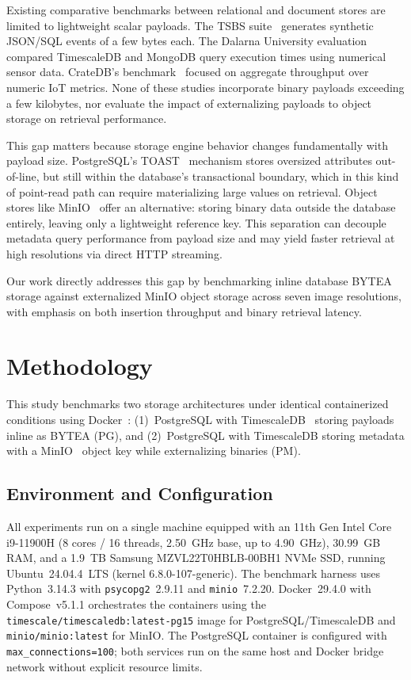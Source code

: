 \documentclass[conference]{IEEEtran}
\begin{document}
Existing comparative benchmarks between relational and document stores are limited to lightweight scalar payloads. The TSBS suite~\cite{tsbs} generates synthetic JSON/SQL events of a few bytes each. The Dalarna University evaluation~\cite{diva_timescaledb_mongodb_eval} compared TimescaleDB and MongoDB query execution times using numerical sensor data. CrateDB's benchmark~\cite{cratedb_ts_benchmark} focused on aggregate throughput over numeric IoT metrics. None of these studies incorporate binary payloads exceeding a few kilobytes, nor evaluate the impact of externalizing payloads to object storage on retrieval performance.

This gap matters because storage engine behavior changes fundamentally with payload size. PostgreSQL's TOAST~\cite{postgresql_toast_docs} mechanism stores oversized attributes out-of-line, but still within the database's transactional boundary, which in this kind of point-read path can require materializing large values on retrieval. Object stores like MinIO~\cite{minio_official} offer an alternative: storing binary data outside the database entirely, leaving only a lightweight reference key. This separation can decouple metadata query performance from payload size and may yield faster retrieval at high resolutions via direct HTTP streaming.

Our work directly addresses this gap by benchmarking inline database BYTEA storage against externalized MinIO object storage across seven image resolutions, with emphasis on both insertion throughput and binary retrieval latency.


\section{Methodology}
\label{sec:methodology}

This study benchmarks two storage architectures under identical containerized conditions using Docker~\cite{docker_official}: (1)~PostgreSQL with TimescaleDB~\cite{timescaledb_official} storing payloads inline as BYTEA (PG), and (2)~PostgreSQL with TimescaleDB storing metadata with a MinIO~\cite{minio_official} object key while externalizing binaries (PM).

\subsection{Environment and Configuration}
All experiments run on a single machine equipped with an 11th Gen Intel Core i9-11900H (8 cores / 16 threads, 2.50~GHz base, up to 4.90~GHz), 30.99~GB RAM, and a 1.9~TB Samsung MZVL22T0HBLB-00BH1 NVMe SSD, running Ubuntu~24.04.4~LTS (kernel 6.8.0-107-generic). The benchmark harness uses Python~3.14.3 with \texttt{psycopg2}~2.9.11 and \texttt{minio}~7.2.20. Docker~29.4.0 with Compose~v5.1.1 orchestrates the containers using the \texttt{timescale/timescaledb:latest-pg15} image for PostgreSQL/TimescaleDB and \texttt{minio/minio:latest} for MinIO. The PostgreSQL container is configured with \texttt{max\_connections=100}; both services run on the same host and Docker bridge network without explicit resource limits.
\end{document}
